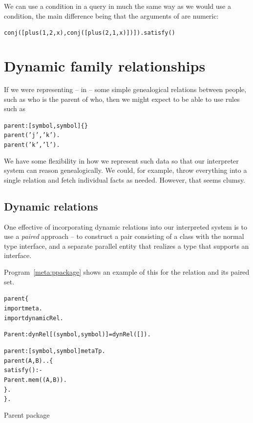 We can use a  condition in a query in much the same way as we would use a  condition, the main difference being that the arguments of  are numeric:
\begin{alltt}
conj([plus(1,2,x),conj([plus(2,1,x)])]).satisfy()
\end{alltt}

\section{Dynamic family relationships}
\label{meta:family}
If we were representing -- in \go -- some simple genealogical relations between people, such as who is the parent of who, then we might expect to be able to use rules such as
\begin{alltt}
parent:[symbol,symbol]\{\}
parent('j','k').
parent('k','l').
\end{alltt}
We have some flexibility in how we represent such data so that our interpreter system can reason genealogically. We could, for example, throw everything into a single  relation and fetch individual facts as needed. However, that seems clumsy.

\subsection{Dynamic relations}
One effective of incorporating dynamic relations into our interpreted system is to use a \emph{paired} approach -- to construct a pair consisting of a  class with the normal  type interface, and a separate parallel  entity that realizes a  type that supports an  interface.

Program~\vref{meta:ppackage} shows an example of this for the  relation and its  paired  set.

\begin{program}
\vspace{0.5ex}
\begin{alltt}
parent\{
  import meta.
  import dynamicRel.
  
  Parent:dynRel[(symbol,symbol)] = dynRel([]).
  
  parent:[symbol,symbol]\conarrow{}metaTp.
  parent(A,B)..\{
    satisfy() :-
      Parent.mem((A,B)).
  \}.
\}.
\end{alltt}
\vspace{-2ex}
\caption{Parent package}
\label{meta:ppackage}
\end{program}

